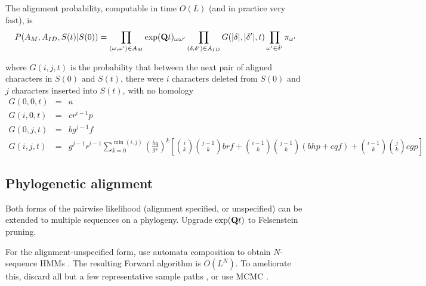 \documentclass{article}
\begin{document}
The alignment probability, computable in time $O(L)$ (and in practice very fast), is
\[
P(A_M,A_{ID},S(t)|S(0)) =
\prod_{(\omega,\omega') \in A_M} \exp({\bf Q}t)_{\omega \omega'}
\prod_{(\delta,\delta') \in A_{ID}} G(|\delta|,|\delta'|,t)
\prod_{\omega'\in \delta'} \pi_{\omega'}
\]

where $G(i,j,t)$ is the probability that between the next pair of aligned characters in $S(0)$ and $S(t)$,
there were $i$ characters deleted from $S(0)$ 
and $j$ characters inserted into $S(t)$,
with no homology
\begin{eqnarray*}
G(0,0,t) & = & a \\
G(i,0,t) & = & cr^{i-1}p \\
G(0,j,t) & = & bg^{j-1}f \\
G(i,j,t) & = &
g^{j-1} r^{i-1}
\sum_{k=0}^{\min(i,j)}
\left(\frac{hq}{gr}\right)^k
\left[
\binom{i}{k} \binom{j-1}{k} brf
+ \binom{i-1}{k} \binom{j-1}{k} (bhp+cqf)
+ \binom{i-1}{k} \binom{j}{k} cgp
\right]
\end{eqnarray*}

\subsection{Phylogenetic alignment}

Both forms of the pairwise likelihood (alignment specified, or unspecified) can be extended to multiple sequences on a phylogeny.
Upgrade $\exp({\bf Q}t)$ to Felsenstein pruning. %

For the alignment-unspecified form, use automata composition to obtain $N$-sequence HMMs \cite{SilvestreRyanEtAl2020}.
The resulting Forward algorithm is $O(L^N)$.
To ameliorate this, discard all but a few representative sample paths \cite{WestessonEtAl2012},
or use MCMC \cite{RedelingsSuchard2007}.



\end{document}
